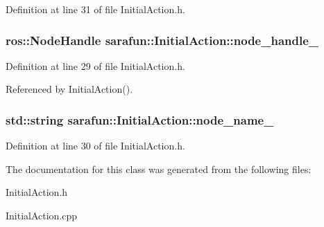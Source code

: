 Definition at line 31 of file Initial\-Action.\-h.

\hypertarget{classsarafun_1_1InitialAction_ab28f63a6c2bfb376d0c52b619fb6b473_ab28f63a6c2bfb376d0c52b619fb6b473}{
\subsubsection[{node\-\_\-handle\-\_\-}]{\setlength{\rightskip}{0pt plus 5cm}ros\-::\-Node\-Handle sarafun\-::\-Initial\-Action\-::node\-\_\-handle\-\_\-\hspace{0.3cm}{\ttfamily [private]}}}\label{classsarafun_1_1InitialAction_ab28f63a6c2bfb376d0c52b619fb6b473_ab28f63a6c2bfb376d0c52b619fb6b473}


Definition at line 29 of file Initial\-Action.\-h.



Referenced by Initial\-Action().

\hypertarget{classsarafun_1_1InitialAction_a985fe910cf04f8e6f918672175eb8ca6_a985fe910cf04f8e6f918672175eb8ca6}{
\subsubsection[{node\-\_\-name\-\_\-}]{\setlength{\rightskip}{0pt plus 5cm}std\-::string sarafun\-::\-Initial\-Action\-::node\-\_\-name\-\_\-\hspace{0.3cm}{\ttfamily [private]}}}\label{classsarafun_1_1InitialAction_a985fe910cf04f8e6f918672175eb8ca6_a985fe910cf04f8e6f918672175eb8ca6}


Definition at line 30 of file Initial\-Action.\-h.



The documentation for this class was generated from the following files\-:\begin{DoxyCompactItemize}
\item 
Initial\-Action.\-h\item 
Initial\-Action.\-cpp\end{DoxyCompactItemize}
